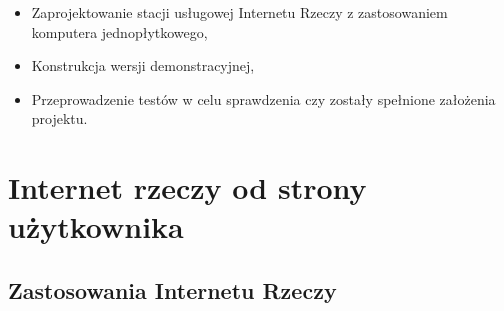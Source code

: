 \documentclass[12pt, twoside, openany]{mwrep}
\begin{document}
\begin{itemize}
    \item Zaprojektowanie stacji usługowej Internetu Rzeczy z zastosowaniem komputera jednopłytkowego,
    \item Konstrukcja wersji demonstracyjnej,
    \item Przeprowadzenie testów w celu sprawdzenia czy zostały spełnione założenia projektu.
\end{itemize}   

\chapter{Internet rzeczy od strony użytkownika}

\section{Zastosowania Internetu Rzeczy}
\end{document}
